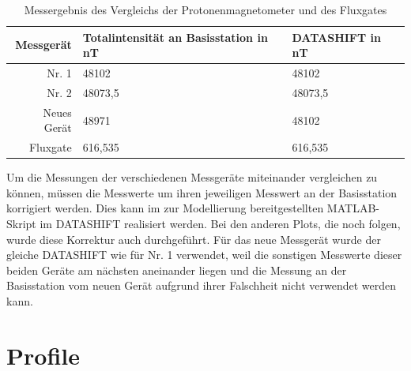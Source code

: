 \begin{table}[!ht]
 \centering
 \caption{Messergebnis des Vergleichs der Protonenmagnetometer und des Fluxgates}
 \begin{tabular}{rll}
 \toprule
 Messgerät & Totalintensität an Basisstation in nT & DATASHIFT in nT \\
 \midrule
 Nr. 1 & 48102 &48102\\
 Nr. 2 & 48073,5 & 48073,5\\
 Neues Gerät & 48971 & 48102\\
 Fluxgate & 616,535 & 616,535\\
 \bottomrule
 \end{tabular}
\label{tab:VergleichErgebnis}
\end{table}

Um die Messungen der verschiedenen Messgeräte miteinander vergleichen zu können, müssen die Messwerte um ihren jeweiligen Messwert an der Basisstation korrigiert werden. Dies kann im zur Modellierung bereitgestellten MATLAB-Skript im DATASHIFT realisiert werden. Bei den anderen Plots, die noch folgen, wurde diese Korrektur auch durchgeführt. Für das neue Messgerät wurde der gleiche DATASHIFT wie für Nr. 1 verwendet, weil die sonstigen Messwerte dieser beiden Geräte am nächsten aneinander liegen und die Messung an der Basisstation vom neuen Gerät aufgrund ihrer Falschheit nicht verwendet werden kann.


\section{Profile}

